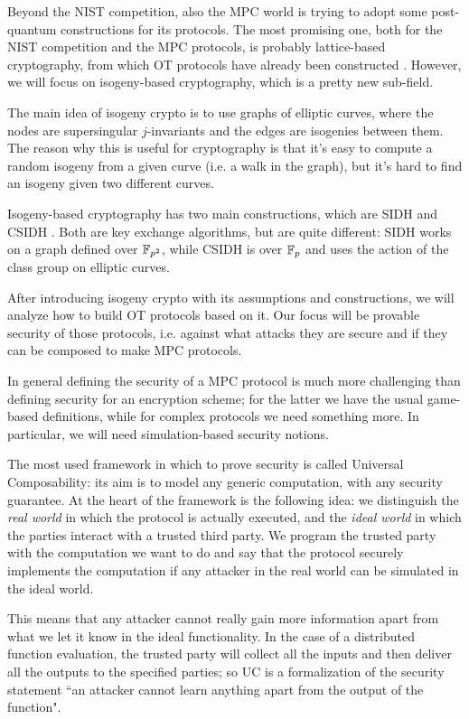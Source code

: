 Beyond the NIST competition, also the MPC world is trying to adopt some post-quantum constructions for its protocols. The most promising one, both for the NIST competition and the MPC protocols, is probably lattice-based cryptography, from which OT protocols have already been constructed \cite{PVW}. However, we will focus on isogeny-based cryptography, which is a pretty new sub-field.

The main idea of isogeny crypto is to use graphs of elliptic curves, where the nodes are supersingular $j$-invariants and the edges are isogenies between them. The reason why this is useful for cryptography is that it's easy to compute a random isogeny from a given curve (i.e. a walk in the graph), but it's hard to find an isogeny given two different curves.

Isogeny-based cryptography has two main constructions, which are SIDH \cite{SIDH11} and CSIDH \cite{CSIDH}. Both are key exchange algorithms, but are quite different: SIDH works on a graph defined over $\mathbb{F}_{p^2}$, while CSIDH is over $\mathbb{F}_p$ and uses the action of the class group on elliptic curves.

After introducing isogeny crypto with its assumptions and constructions, we will analyze how to build OT protocols based on it. Our focus will be provable security of those protocols, i.e. against what attacks they are secure and if they can be composed to make MPC protocols.

In general defining the security of a MPC protocol is much more challenging than defining security for an encryption scheme; for the latter we have the usual game-based definitions, while for complex protocols we need something more. In particular, we will need simulation-based security notions.

The most used framework in which to prove security is called Universal Composability: its aim is to model any generic computation, with any security guarantee. At the heart of the framework is the following idea: we distinguish the \emph{real world} in which the protocol is actually executed, and the \emph{ideal world} in which the parties interact with a trusted third party. We program the trusted party with the computation we want to do and say that the protocol securely implements the computation if any attacker in the real world can be simulated in the ideal world.

This means that any attacker cannot really gain more information apart from what we let it know in the ideal functionality. In the case of a distributed function evaluation, the trusted party will collect all the inputs and then deliver all the outputs to the specified parties; so UC is a formalization of the security statement ``an attacker cannot learn anything apart from the output of the function".

